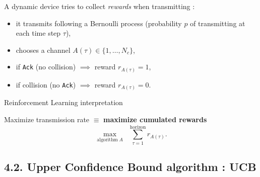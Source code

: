 \begin{frameO}

    A dynamic device tries to collect \emph{rewards} when transmitting :

    \begin{itemize}
        \tightlist
        \item
              it transmits following a Bernoulli process \newline
              (probability \(p\) of transmitting at each time step \(\tau\)),
        \item
              chooses a channel \(A(\tau) \in \{1,\dots,N_c\}\),
        \item
              if \texttt{Ack} (no collision) \hspace*{10pt} \(\implies\) reward
              \(r_{A(\tau)} = 1\),
        \item
              if collision (no \texttt{Ack}) \hspace*{10pt} \(\implies\) reward
              \(r_{A(\tau)} = 0\).
    \end{itemize}


    \begin{colorblock}{Reinforcement Learning interpretation}

        Maximize transmission rate \(\equiv\) \textbf{maximize cumulated
            rewards}
        \[\max_{\text{algorithm}\;A} \;\; \sum_{\tau=1}^{\text{horizon}} r_{A(\tau)}.\]

    \end{colorblock}

\end{frameO}

\subsection{\hfill{}4.2. Upper Confidence Bound algorithm : UCB\hfill{}}

